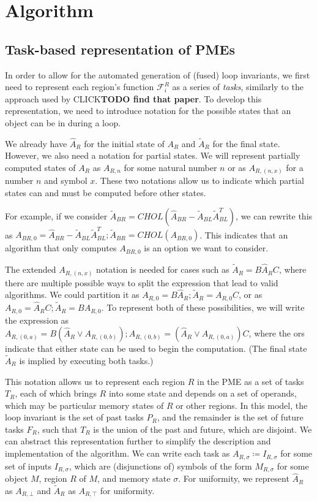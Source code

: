 \documentclass[12pt,letterpaper]{article}
\newcommand*{\opF}{\mathcal{F}}
\begin{document}
\section{Algorithm}

\subsection{Task-based representation of PMEs}
In order to allow for the automated generation of (fused) loop invariants, we first need to represent each region's function $\opF_i^R$ as a series of \emph{tasks}, similarly to the approach used by CLICK\textbf{TODO find that paper}.
To develop this representation, we need to introduce notation for the possible states that an object can be in during a loop.

We already have $\hat{A}_R$ for the initial state of $A_R$ and $\widetilde{A}_R$ for the final state.
However, we also need a notation for partial states.
We will represent partially computed states of $A_R$ as $A_{R, n}$ for some natural number $n$ or as $A_{R, (n, x)}$ for a number $n$ and symbol $x$.
These two notations allow us to indicate which partial states can and must be computed before other states.

For example, if we consider $\widetilde{A}_{BR} = CHOL(\hat{A}_{BR} - \widetilde{A}_{BL}\widetilde{A}_{BL}^T)$, we can rewrite this as $A_{BR, 0} = \hat{A}_{BR} - \widetilde{A}_{BL}\widetilde{A}_{BL}^T; \widetilde{A}_{BR} = CHOL(A_{BR, 0})$.
This indicates that an algorithm that only computes $A_{BR, 0}$ is an option we want to consider.

The extended $A_{R, (n, x)}$ notation is needed for cases such as $\widetilde{A}_R = B\hat{A}_RC$, where there are multiple possible ways to split the expression that lead to valid algorithms.
We could partition it as $A_{R, 0} = B\hat{A}_R; \widetilde{A}_R = A_{R, 0}C$, or as $A_{R, 0} = \hat{A}_RC; \widetilde{A}_R = BA_{R, 0}$.
To represent both of these possibilities, we will write the expression as $A_{R, (0, a)} = B(\hat{A}_R \vee A_{R, (0, b)}); A_{R, (0, b)} = (\hat{A}_R \vee A_{R, (0, a)})C$, where the ors indicate that either state can be used to begin the computation.
(The final state $\widetilde{A}_R$ is implied by executing both tasks.)

This notation allows us to represent each region $R$ in the PME as a set of tasks $T_R$, each of which brings $R$ into some state and depends on a set of operands, which may be particular memory states of $R$ or other regions.
In this model, the loop invariant is the set of past tasks $P_{R}$, and the remainder is the set of future tasks $F_{R}$, such that $T_R$ is the union of the past and future, which are disjoint.
We can abstract this representation further to simplify the description and implementation of the algorithm.
We can write each task as $A_{R, \sigma} \coloneqq I_{R, \sigma}$ for some set of inputs $I_{R, \sigma}$, which are (disjunctions of) symbols of the form $M_{R, \sigma}$ for some object $M$, region $R$ of $M$, and memory state $\sigma$.
For uniformity, we represent $\hat{A}_R$ as $A_{R, \bot}$ and $\widetilde{A}_R$ as $A_{R, \top}$ for uniformity.
\end{document}
